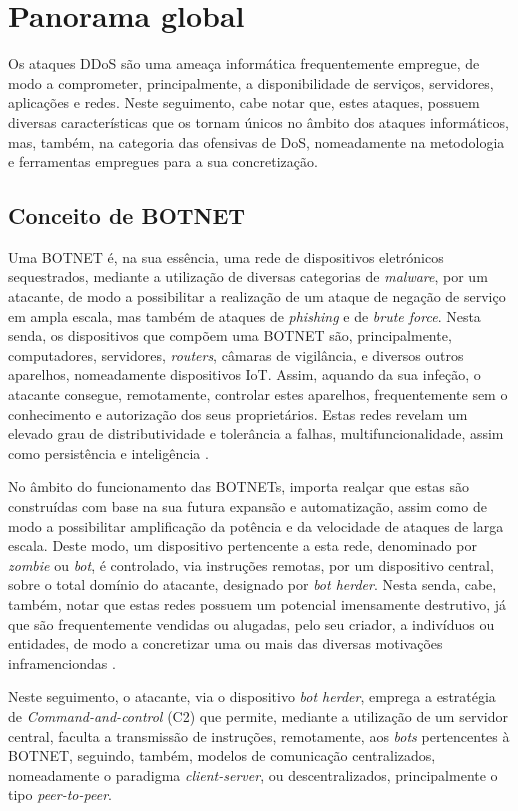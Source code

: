 \section{Panorama global}
Os ataques DDoS são uma ameaça informática frequentemente empregue, de modo a comprometer, principalmente, a disponibilidade de serviços, servidores, aplicações e redes. Neste seguimento, cabe notar que, estes ataques, possuem diversas características que os tornam únicos no âmbito dos ataques informáticos, mas, também, na categoria das ofensivas de DoS, nomeadamente na metodologia e ferramentas empregues para a sua concretização.
\subsection{Conceito de BOTNET}
Uma BOTNET é, na sua essência, uma rede de dispositivos eletrónicos sequestrados, mediante a utilização de diversas categorias de \textit{malware}, por um atacante, de modo a possibilitar a realização de um ataque de negação de serviço em ampla escala, mas também de ataques de \textit{phishing} e de \textit{brute force}. Nesta senda, os dispositivos que compõem uma BOTNET são, principalmente, computadores, servidores, \textit{routers}, câmaras de vigilância, e diversos outros aparelhos, nomeadamente dispositivos IoT. Assim, aquando da sua infeção, o atacante consegue, remotamente, controlar estes aparelhos, frequentemente sem o conhecimento e autorização dos seus proprietários. Estas redes revelam um elevado grau de distributividade e tolerância a falhas, multifuncionalidade, assim como persistência e inteligência \cite{kaspersky_botnets_2017, paloaltonetwork_botnets}.

No âmbito do funcionamento das BOTNETs, importa realçar que estas são construídas com base na sua futura expansão e automatização, assim como de modo a possibilitar amplificação da potência e da velocidade de ataques de larga escala. Deste modo, um dispositivo pertencente a esta rede, denominado por \textit{zombie} ou \textit{bot}, é controlado, via instruções remotas, por um dispositivo central, sobre o total domínio do atacante, designado por \textit{bot herder}. Nesta senda, cabe, também, notar que estas redes possuem um potencial imensamente destrutivo, já que são frequentemente vendidas ou alugadas, pelo seu criador, a indivíduos ou entidades, de modo a concretizar uma ou mais das diversas motivações inframenciondas \cite{kaspersky_botnets_2017, paloaltonetwork_botnets}.

Neste seguimento, o atacante, via o dispositivo \textit{bot herder}, emprega a estratégia de \textit{Command-and-control} (C2) que permite, mediante a utilização de um servidor central, faculta a transmissão de instruções, remotamente, aos \textit{bots} pertencentes à BOTNET, seguindo, também, modelos de comunicação centralizados, nomeadamente o paradigma \textit{client-server}, ou descentralizados, principalmente o tipo \textit{peer-to-peer}.

